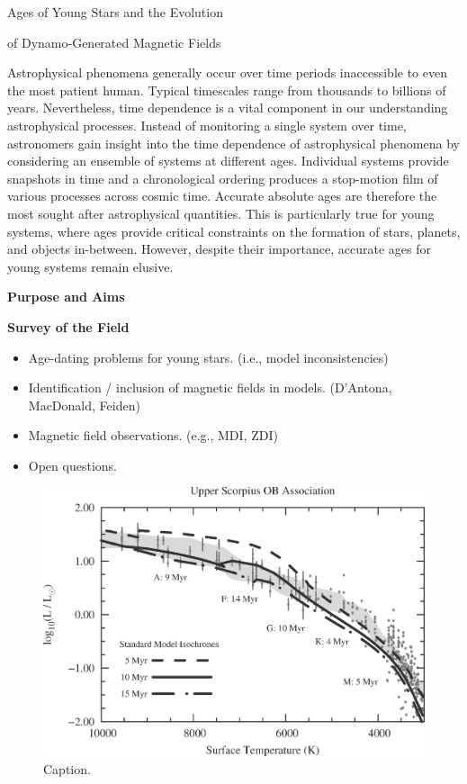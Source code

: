 \documentclass[12pt,a4paper]{article}
\begin{document}
\begin{center}
	{\bf {\LARGE Ages of Young Stars and the Evolution 
	
	of Dynamo-Generated Magnetic Fields}} 
\end{center}

Astrophysical phenomena generally occur over time periods inaccessible to even the most patient human. Typical timescales range from thousands to billions of years. Nevertheless, time dependence is a vital component in our understanding astrophysical processes. 
Instead of monitoring a single system over time, astronomers gain insight into the time dependence of astrophysical phenomena by considering an ensemble of systems at different ages. Individual systems provide snapshots in time and a chronological ordering produces a stop-motion film of various processes across cosmic time. Accurate absolute ages are therefore the most sought after astrophysical quantities. This is particularly true for young systems, where ages provide critical constraints on the formation of stars, planets, and objects in-between. However, despite their importance, accurate ages for young systems remain elusive.

\vspace{\baselineskip}

{\bf \large Purpose and Aims}

\clearpage

{\bf \large Survey of the Field}
\begin{itemize}
	\item Age-dating problems for young stars. (i.e., model inconsistencies)
	\item Identification / inclusion of magnetic fields in models. (D'Antona, MacDonald, Feiden)
	\item Magnetic field observations. (e.g., MDI, ZDI)
	\item Open questions.
\end{itemize}

\begin{figure}
	\centering
	\includegraphics[width=0.75\linewidth]{./fig/USco_Age_Problems.eps}
	\caption{Caption.}
	\label{fig:probs}
\end{figure}
\end{document}
